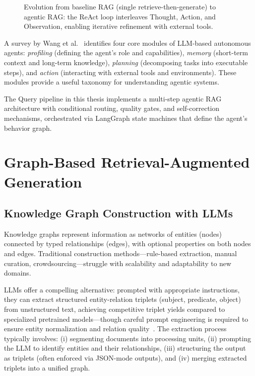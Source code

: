 \begin{figure}[htbp]
\centering
{}
\caption{Evolution from baseline RAG (single retrieve-then-generate) to agentic RAG: the ReAct loop interleaves Thought, Action, and Observation, enabling iterative refinement with external tools.}
\label{fig:agentic_rag}
\end{figure}

A survey by Wang et al.~\cite{wang2025surveylargelanguagemodel} identifies four core modules of LLM-based autonomous agents: \emph{profiling} (defining the agent's role and capabilities), \emph{memory} (short-term context and long-term knowledge), \emph{planning} (decomposing tasks into executable steps), and \emph{action} (interacting with external tools and environments). These modules provide a useful taxonomy for understanding agentic systems.

The Query pipeline in this thesis implements a multi-step agentic RAG architecture with conditional routing, quality gates, and self-correction mechanisms, orchestrated via LangGraph state machines that define the agent's behavior graph.

\section{Graph-Based Retrieval-Augmented Generation}
\label{sec:rw:graphrag}

\subsection{Knowledge Graph Construction with LLMs}
\label{sec:rw:kg_construction}

Knowledge graphs represent information as networks of entities (nodes) connected by typed relationships (edges), with optional properties on both nodes and edges. Traditional construction methods---rule-based extraction, manual curation, crowdsourcing---struggle with scalability and adaptability to new domains.

LLMs offer a compelling alternative: prompted with appropriate instructions, they can extract structured entity-relation triplets (subject, predicate, object) from unstructured text, achieving competitive triplet yields compared to specialized pretrained models---though careful prompt engineering is required to ensure entity normalization and relation quality~\cite{trajanoska2023enhancingknowledgegraphconstruction}. The extraction process typically involves: (i) segmenting documents into processing units, (ii) prompting the LLM to identify entities and their relationships, (iii) structuring the output as triplets (often enforced via JSON-mode outputs), and (iv) merging extracted triplets into a unified graph.

